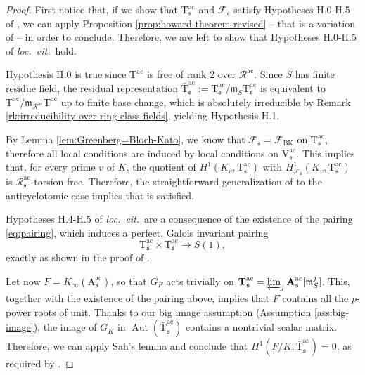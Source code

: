 \documentclass[12pt,reqno]{amsart}
\theoremstyle{definition}
\theoremstyle{remark}
\newcommand{\V}{\boldsymbol{\mathrm{V}}}
\newcommand{\T}{\boldsymbol{\mathrm{T}}}
\newcommand{\calR}{\mathcal{R}}
\newcommand{\A}{\boldsymbol{\mathrm{A}}}
\DeclareMathOperator{\Aut}{Aut}
\newcommand{\ac}{\mathrm{ac}}
\newcommand{\BK}{\mathrm{BK}}
\newcommand{\m}{\mathfrak{m}}
\newcommand{\sfrak}{\mathfrak{s}}
\begin{document}
\begin{proof}
   First notice that, if we show that $\T_\sfrak^\ac$ and $\mathcal{F}_\sfrak$ satisfy Hypotheses H.0-H.5 of \cite[§1.3]{Howard04:heegner-point-kolyvagin-system}, we can apply Proposition \ref{prop:howard-theorem-revised} -- that is a variation of \cite[Theorem 1.6.1]{Howard04:heegner-point-kolyvagin-system} -- in order to conclude. Therefore, we are left to show that Hypotheses H.0-H.5 of \textit{loc.~cit.}~hold.

    Hypothesis H.0 is true since $\T^\ac$ is free of rank 2 over $\calR^\ac$. Since $S$ has finite residue field, the residual representation $\bar{\T}_\sfrak^\ac:=\T_\sfrak^\ac/\m_S\T_\sfrak^\ac$ is equivalent to $\T^\ac/\m_{\calR^\ac}\T^\ac$ up to finite base change, which is absolutely irreducible by Remark \ref{rk:irreducibility-over-ring-class-fields}, yielding Hypothesis H.1.

    By Lemma \ref{lem:Greenberg=Bloch-Kato}, we know that $\mathcal{F}_\sfrak=\mathcal{F}_\BK$ on $\T_\sfrak^\ac$, therefore all local conditions are induced by local conditions on $\V^\ac_\sfrak$. This implies that, for every prime $v$ of $K$, the quotient of $H^1(K_v,\T_\sfrak^\ac)$ with $H^1_{\mathcal{F}_{\sfrak}}(K_v,\T_\sfrak^\ac)$ is $\calR_\sfrak^\ac$-torsion free. Therefore, the straightforward generalization of \cite[Lemma 3.7.1]{Mazur-Rubin:Kolyvagin-systems} to the anticyclotomic case implies that \cite[Hypothesis H.3]{Howard04:heegner-point-kolyvagin-system} is satisfied.

    Hypotheses H.4-H.5 of \textit{loc.~cit.}~are a consequence of the existence of the pairing \eqref{eq:pairing}, which induces a perfect, Galois invariant pairing 
    \begin{equation*}
        \T_\sfrak^\ac\times\T_\sfrak^\ac\to S(1),
    \end{equation*}
    exactly as shown in the proof of \cite[Proposition 2.1.3]{Howard04:heegner-point-kolyvagin-system}.
    
    Let now $F=K_\infty(\A^\ac_\sfrak)$, so that $G_F$ acts trivially on $\T^\ac_\sfrak=\varprojlim_j\A_\sfrak^\ac[\mathfrak{m}_S^j]$. This, together with the existence of the pairing above, implies that $F$ contains all the $p$-power roots of unit. Thanks to our big image assumption (Assumption \ref{ass:big-image}), the image of $G_K$ in $\Aut(\bar{\T}_\sfrak^\ac)$ contains a nontrivial scalar matrix. Therefore, we can apply Sah's lemma \cite[Theorem 2.7.(c)]{sah:1968automorphisms} and conclude that $H^1(F/K,\bar{\T}_\sfrak^\ac)=0$, as required by \cite[Hypothesis H.2]{Howard04:heegner-point-kolyvagin-system}.
\end{proof}
\end{document}

